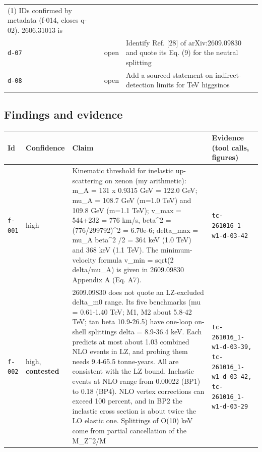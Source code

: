 \documentclass[11pt,a4paper]{article}
\begin{document}
\begin{longtable}{@{}p{}p{}p{}p{}@{}}
(1) IDs confirmed by metadata (f-014, closes q-02). 2606.31013 is \\
\texttt{d-07} & open & Identify Ref. [28] of arXiv:2609.09830 and quote its Eq. (9) for the neutral splitting &  \\
\texttt{d-08} & open & Add a sourced statement on indirect-detection limits for TeV higgsinos &  \\
\bottomrule\end{longtable}
\subsection{Findings and evidence}
\begin{longtable}{@{}p{}p{}p{}p{}@{}}
\toprule Id & Confidence & Claim & Evidence (tool calls, figures) \\ \midrule \endhead
\texttt{f-001} & high & Kinematic threshold for inelastic up-scattering on xenon (my arithmetic): m\_A = 131 x 0.9315 GeV = 122.0 GeV; mu\_A = 108.7 GeV (m=1.0 TeV) and 109.8 GeV (m=1.1 TeV); v\_max = 544+232 = 776 km/s, beta\textasciicircum{}2 = (776/299792)\textasciicircum{}2 = 6.70e-6; delta\_max = mu\_A beta\textasciicircum{}2 /2 = 364 keV (1.0 TeV) and 368 keV (1.1 TeV). The minimum-velocity formula v\_min = sqrt(2 delta/mu\_A) is given in 2609.09830 Appendix A (Eq. A7). & \texttt{tc-261016\_\allowbreak{}1-w1-d-03-42} \\
\texttt{f-002} & high, \textbf{contested} & 2609.09830 does not quote an LZ-excluded delta\_m0 range. Its five benchmarks (\textbar{}mu\textbar{} = 0.61-1.40 TeV; \textbar{}M1\textbar{}, M2 about 5.8-42 TeV; tan beta 10.9-26.5) have one-loop on-shell splittings delta = 8.9-36.4 keV. Each predicts at most about 1.03 combined NLO events in LZ, and probing them needs 9.4-65.5 tonne-years. All are consistent with the LZ bound. Inelastic events at NLO range from 0.00022 (BP1) to 0.18 (BP4). NLO vertex corrections can exceed 100 percent, and in BP2 the inelastic cross section is about twice the LO elastic one. Splittings of O(10) keV come from partial cancellation of the M\_Z\textasciicircum{}2/M & \texttt{tc-261016\_\allowbreak{}1-w1-d-03-39,\allowbreak{} tc-261016\_\allowbreak{}1-w1-d-03-42,\allowbreak{} tc-261016\_\allowbreak{}1-w1-d-03-29} \\

\end{longtable}
\end{document}
